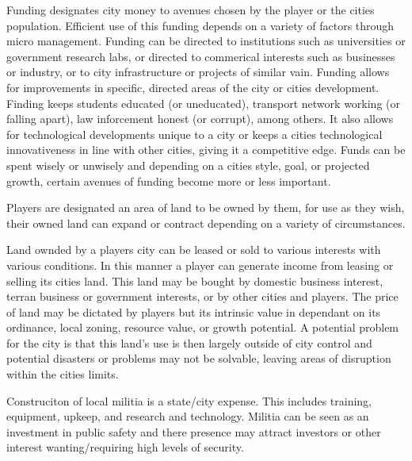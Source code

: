 Funding designates city money to avenues chosen by the player or the cities population. Efficient use of this funding depends on a variety of factors through micro management. Funding can be directed to institutions such as universities or government research labs, or directed to commerical interests such as businesses or industry, or to city infrastructure or projects of similar vain. Funding allows for improvements in specific, directed areas of the city or cities development. Finding keeps students educated (or uneducated), transport network working (or falling apart), law inforcement honest (or corrupt), among others. It also allows for technological developments unique to a city or keeps a cities technological innovativeness in line with other cities, giving it a competitive edge. Funds can be spent wisely or unwisely and depending on a cities style, goal, or projected growth, certain avenues of funding become more or less important.


Players are designated an area of land to be owned by them, for use as they wish, their owned land can expand or contract depending on a variety of circumstances. 

Land ownded by a players city can be leased or sold to various interests with various conditions. In this manner a player can generate income from leasing or selling its cities land. This land may be bought by domestic business interest, terran business or government interests, or by other cities and players. The price of land may be dictated by players but its intrinsic value in dependant on its ordinance, local zoning, resource value, or growth potential. %
A potential problem for the city is that this land's use is then largely outside of city control and potential disasters or problems may not be solvable, leaving areas of disruption within the cities limits.



Construciton of local militia is a state/city expense. This includes training, equipment, upkeep, and research and technology. Militia can be seen as an investment in public safety and there presence may attract investors or other interest wanting/requiring high levels of security.




